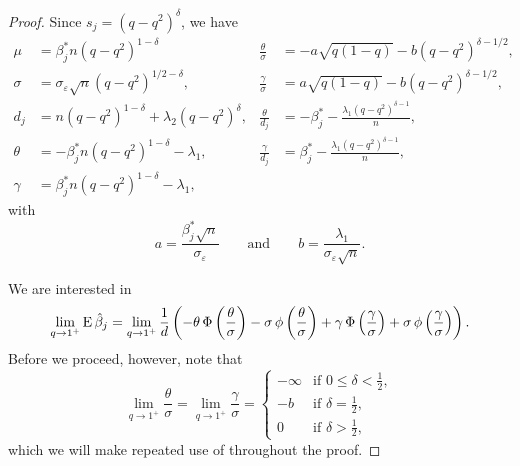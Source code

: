\begin{proof}

  Since \(s_j = (q - q^2)^\delta\), we have
  \begin{align*}
    \mu    & = \beta_j^* n (q - q^2)^{1 - \delta}                     & \frac{\theta}{\sigma} & = -a \sqrt{q(1-q)} - b (q - q^2)^{\delta - 1/2},           \\
    \sigma & = \sigma_\varepsilon \sqrt{n} (q - q^2)^{1/2 - \delta},  & \frac{\gamma}{\sigma} & = a \sqrt{q(1-q)} - b (q - q^2)^{\delta - 1/2},            \\
    d_j    & = n (q - q^2)^{1 - \delta} + \lambda_2 (q - q^2)^\delta, & \frac{\theta}{d_j}    & = -\beta_j^* - \frac{\lambda_1 (q - q^2)^{\delta - 1}}{n}, \\
    \theta & = -\beta^*_j n (q - q^2)^{1-\delta} - \lambda_1,         & \frac{\gamma}{d_j}    & = \beta_j^* - \frac{\lambda_1 (q - q^2)^{\delta - 1}}{n},  \\
    \gamma & = \beta^*_j n (q - q^2)^{1-\delta} - \lambda_1,
  \end{align*}
  with
  \[
    a = \frac{\beta_j^* \sqrt{n}}{\sigma_\varepsilon} \qquad \text{and} \qquad b = \frac{\lambda_1}{\sigma_\varepsilon \sqrt{n}}.
  \]

  We are interested in
  \begin{equation}
    \label{eq:eval-qlimit}
    \lim_{q \rightarrow 1^+} \operatorname{E} \hat{\beta}_j =\lim_{q \rightarrow 1^+}\frac{1}{d}\left(-\theta \operatorname{\Phi}\left(\frac{\theta}{\sigma}\right) - \sigma \operatorname{\phi}\left(\frac{\theta}{\sigma}\right) + \gamma \operatorname{\Phi}\left(\frac{\gamma}{\sigma}\right) + \sigma \operatorname{\phi}\left(\frac{\gamma}{\sigma}\right)\right).
  \end{equation}
  Before we proceed, however, note that
  \begin{equation}
    \label{eq:eval-sigma-limits}
    \lim_{q \rightarrow 1^+} \frac{\theta}{\sigma} = \lim_{q \rightarrow 1^+} \frac{\gamma}{\sigma} =
    \begin{cases}
      -\infty & \text{if } 0 \leq \delta < \frac{1}{2}, \\
      -b      & \text{if } \delta = \frac{1}{2},        \\
      0       & \text{if } \delta > \frac{1}{2},
    \end{cases}
  \end{equation}
  which we will make repeated use of throughout the proof.


\end{proof}
